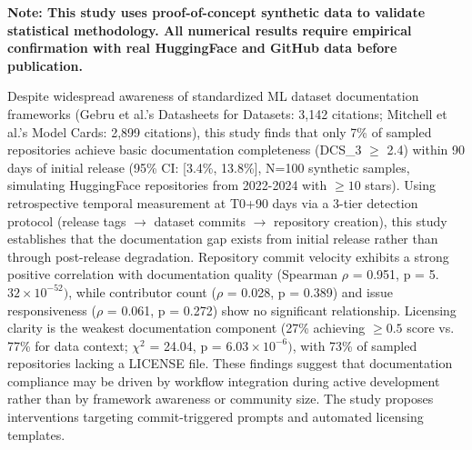 
\textbf{Note: This study uses proof-of-concept synthetic data to validate statistical methodology. All numerical results require empirical confirmation with real HuggingFace and GitHub data before publication.}

Despite widespread awareness of standardized ML dataset documentation frameworks (Gebru et al.'s Datasheets for Datasets: 3,142 citations; Mitchell et al.'s Model Cards: 2,899 citations), this study finds that only 7\% of sampled repositories achieve basic documentation completeness (DCS\_3 $\geq$ 2.4) within 90 days of initial release (95\% CI: [3.4\%, 13.8\%], N=100 synthetic samples, simulating HuggingFace repositories from 2022-2024 with $\geq 10$ stars). Using retrospective temporal measurement at T0+90 days via a 3-tier detection protocol (release tags $\rightarrow$ dataset commits $\rightarrow$ repository creation), this study establishes that the documentation gap exists from initial release rather than through post-release degradation. Repository commit velocity exhibits a strong positive correlation with documentation quality (Spearman $\rho$ = 0.951, p = 5.$32\times 10^{-52})$, while contributor count ($\rho$ = 0.028, p = 0.389) and issue responsiveness ($\rho$ = 0.061, p = 0.272) show no significant relationship. Licensing clarity is the weakest documentation component (27\% achieving $\geq 0.5$ score vs. 77\% for data context; $\chi^2$ = 24.04, p = 6.$03\times 10^{-6})$, with 73\% of sampled repositories lacking a LICENSE file. These findings suggest that documentation compliance may be driven by workflow integration during active development rather than by framework awareness or community size. The study proposes interventions targeting commit-triggered prompts and automated licensing templates.

